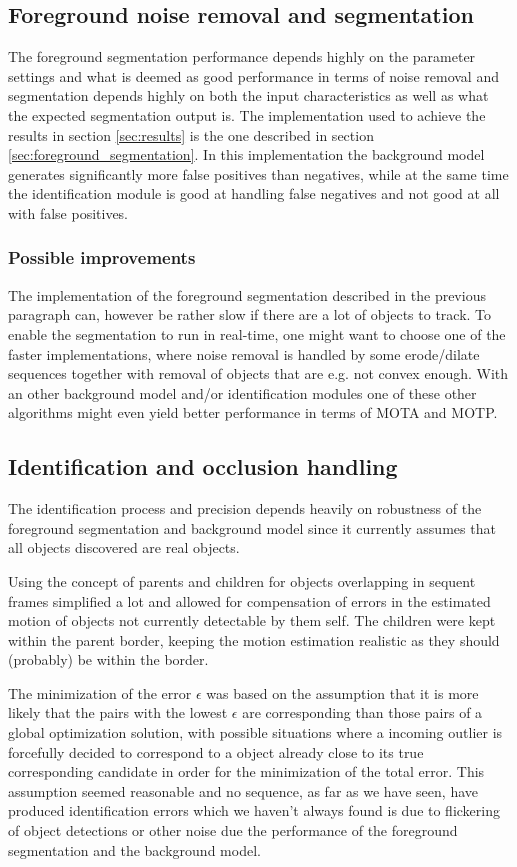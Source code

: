 \subsection{Foreground noise removal and segmentation}
The foreground segmentation performance depends highly on the parameter settings and what is deemed as good performance in terms of noise removal and segmentation depends highly on both the input characteristics as well as what the expected segmentation output is. The implementation used to achieve the results in section \ref{sec:results}  is the one  described in section \ref{sec:foreground_segmentation}. In this implementation the background model generates significantly more false positives than negatives, while at the same time the identification module is good at handling false negatives and not good at all with false positives. 

\subsubsection{Possible improvements}
The implementation of the foreground segmentation described in the previous paragraph can, however be rather slow if there are a lot of objects to track. To enable the segmentation to run in real-time, one might want to choose one of the faster implementations, where noise removal is handled by some erode/dilate sequences together with removal of objects that are e.g. not convex enough. With an other background model and/or identification modules one of these other algorithms might even yield better performance in terms of MOTA and MOTP.

\pagebreak
\subsection{Identification and occlusion handling}
The identification process and precision depends heavily on robustness of the foreground segmentation and background model since it currently assumes that all objects discovered are real objects.

Using the concept of parents and children for objects overlapping in sequent frames simplified a lot and allowed for compensation of errors in the estimated motion of objects not currently detectable by them self. The children were kept within the parent border, keeping the motion estimation realistic as they should (probably) be within the border.

The minimization of the error $\epsilon$ was based on the assumption that it is more likely that the pairs with the lowest $\epsilon$ are corresponding than those pairs of a global optimization solution, with possible situations where a incoming outlier is forcefully decided to correspond to a object already close to its true corresponding candidate in order for the minimization of the total error. This assumption seemed reasonable and no sequence, as far as we have seen, have produced identification errors which we haven't always found is due to flickering of object detections or other noise due the performance of the foreground segmentation and the background model.

